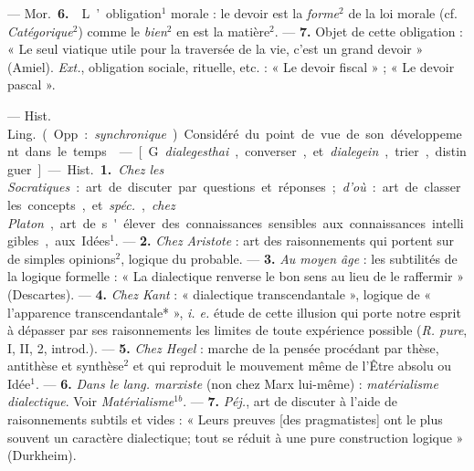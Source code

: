 \begin{itemize}[leftmargin=1cm, label=, itemsep=1pt]
 — \si{Mor.} {\bf 6.}  L’obligation$^1$ morale : le devoir est la {\it forme}$^2$
de la loi morale (cf. {\it Catégorique}$^2$)
comme le {\it bien}$^2$ en est la matière$^2$. —
 {\bf 7.}  Objet de cette obligation : « Le
seul viatique utile pour la traversée
de la vie, c’est un grand devoir »
(Amiel). {\it Ext.}, obligation sociale,
rituelle, etc. : « Le devoir fiscal » ;
« Le devoir pascal ».

 — \si{Hist. Ling.} (Opp. : {\it synchronique}).
Considéré du point de vue de son développement dans le temps.

 — [G. {\it dialegesthai}, converser, et {\it dialegein}, trier, distinguer]
— \si{Hist.} {\bf 1.} {\it Chez les Socratiques} : art
de discuter par questions et réponses ; {\it d'où} : art de classer les concepts,
et {\it spéc.}, {\it chez Platon}, art de s'élever
des connaissances sensibles aux
connaissances intelligibles, aux
Idées$^1$. — {\bf 2.} {\it Chez Aristote} : art des
raisonnements qui portent sur de
simples opinions$^2$, logique du probable. — {\bf 3.} {\it Au moyen âge} : les subtilités de la logique formelle : « La
dialectique renverse le bon sens au
lieu de le raffermir » (Descartes). —
 {\bf 4.} {\it Chez Kant} : « dialectique transcendantale », logique de « l’apparence transcendantale* », {\it i. e.} étude
de cette illusion qui porte notre
esprit à dépasser par ses raisonnements les limites de toute expérience possible ({\it R. pure}, I, II, 2,
introd.). — {\bf 5.} {\it Chez Hegel} : marche de
la pensée procédant par thèse, antithèse et synthèse$^2$ et qui reproduit
le mouvement même de l’Être
absolu ou Idée$^1$. — {\bf 6.} {\it Dans le lang.
marxiste} (non chez Marx lui-même) :
{\it matérialisme dialectique}. Voir {\it Matérialisme}$^{1b}$. — {\bf 7.} {\it Péj.}, art de discuter
à l’aide de raisonnements subtils et
vides : « Leurs preuves [des pragmatistes] ont le plus souvent un caractère
dialectique; tout se réduit à une pure
construction logique » (Durkheim).


\end{itemize}
